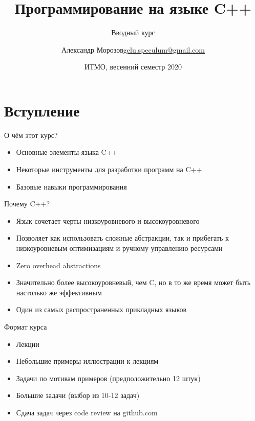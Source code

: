 \documentclass[unknownkeysallowed,xcolor=table]{beamer}
\title[C++]
{Программирование на языке C++}
\subtitle{Вводный курс}
\author[А.~Б.~Морозов]
{
  \texorpdfstring{Александр Морозов\newline\href{mailto:gelu.speculum@gmail.com}{gelu.speculum@gmail.com}}
  {Александр Морозов}
}
\date[ITMO 2020]
{ИТМО, весенний семестр 2020}
\begin{document}
 
\frame{\titlepage}

\section{Вступление}

\begin{frame}{О чём этот курс?}
\begin{itemize}
  \item Основные элементы языка C++ \vspace{3em}
  \item Некоторые инструменты для разработки программ на C++ \vspace{3em}
  \item Базовые навыки программирования
\end{itemize}
\end{frame}

\begin{frame}{Почему C++?}
\begin{itemize}
  \item Язык сочетает черты низкоуровневого и высокоуровневого \vspace{1em}
  \item Позволяет как использовать сложные абстракции, так и прибегать к низкоуровневым оптимизациям и ручному управлению ресурсами \vspace{1em}
  \item Zero overhead abstractions \vspace{1em}
  \item Значительно более высокоуровневый, чем C, но в то же время может быть настолько же эффективным \vspace{1em}
  \item Один из самых распространенных прикладных языков
\end{itemize}
\end{frame}

\begin{frame}{Формат курса}
  \begin{itemize}
    \item Лекции \vspace{1em}
    \item Небольшие примеры-иллюстрации к лекциям \vspace{1em}
    \item Задачи по мотивам примеров (предположительно 12 штук)\vspace{1em}
    \item Большие задачи (выбор из 10-12 задач)\vspace{1em}
    \item Сдача задач через code review на github.com
  \end{itemize}
\end{frame}
\end{document}
